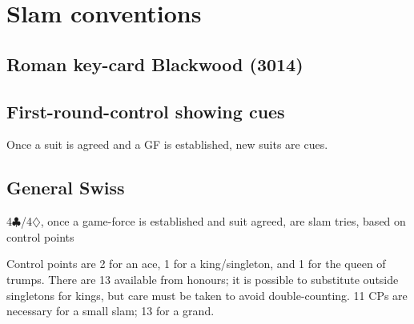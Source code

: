 \documentclass[a4paper,12pt]{article}
\begin{document}
\section{Slam conventions}

\subsection{Roman key-card Blackwood (3014)}

\subsection{First-round-control showing cues}

Once a suit is agreed and a GF is established, new suits are cues.

\subsection{General Swiss}

4$\clubsuit$/4$\diamondsuit$, once a game-force is established and suit agreed, are slam tries, based
on control points

Control points are 2 for an ace, 1 for a king/singleton, and 1 for the queen of
trumps.  There are 13 available from honours; it is possible to substitute
outside singletons for kings, but care must be taken to avoid double-counting.
11 CPs are necessary for a small slam; 13 for a grand.
\end{document}
